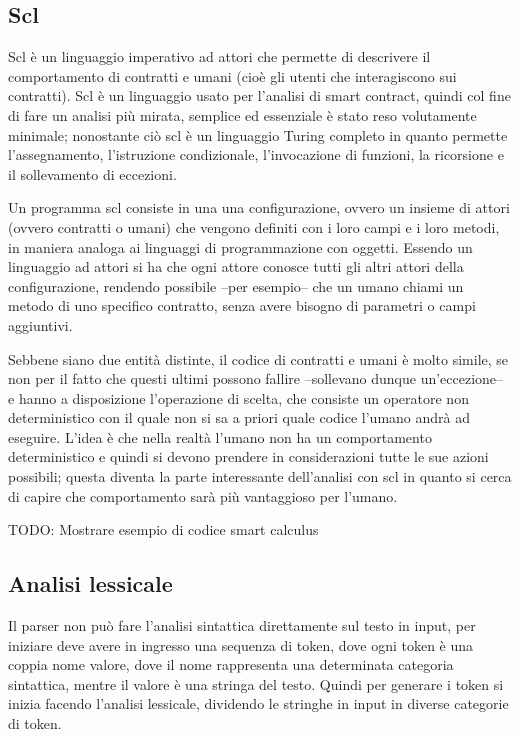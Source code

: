 \documentclass[]{article}
\begin{document}
\hypertarget{scl}{%
\subsection{Scl}\label{scl}}

Scl è un linguaggio imperativo ad attori che permette di descrivere il
comportamento di contratti e umani (cioè gli utenti che interagiscono
sui contratti). Scl è un linguaggio usato per l'analisi di smart
contract, quindi col fine di fare un analisi più mirata, semplice ed
essenziale è stato reso volutamente minimale; nonostante ciò scl è un
linguaggio Turing completo in quanto permette l'assegnamento,
l'istruzione condizionale, l'invocazione di funzioni, la ricorsione e il
sollevamento di eccezioni.

Un programma scl consiste in una una configurazione, ovvero un insieme
di attori (ovvero contratti o umani) che vengono definiti con i loro
campi e i loro metodi, in maniera analoga ai linguaggi di programmazione
con oggetti. Essendo un linguaggio ad attori si ha che ogni attore
conosce tutti gli altri attori della configurazione, rendendo possibile
--per esempio-- che un umano chiami un metodo di uno specifico
contratto, senza avere bisogno di parametri o campi aggiuntivi.

Sebbene siano due entità distinte, il codice di contratti e umani è
molto simile, se non per il fatto che questi ultimi possono fallire
--sollevano dunque un'eccezione-- e hanno a disposizione l'operazione di
scelta, che consiste un operatore non deterministico con il quale non si
sa a priori quale codice l'umano andrà ad eseguire. L'idea è che nella
realtà l'umano non ha un comportamento deterministico e quindi si devono
prendere in considerazioni tutte le sue azioni possibili; questa diventa
la parte interessante dell'analisi con scl in quanto si cerca di capire
che comportamento sarà più vantaggioso per l'umano.

TODO: Mostrare esempio di codice smart calculus

\hypertarget{analisi-lessicale}{%
\subsection{Analisi lessicale}\label{analisi-lessicale}}

Il parser non può fare l'analisi sintattica direttamente sul testo in
input, per iniziare deve avere in ingresso una sequenza di token, dove
ogni token è una coppia nome valore, dove il nome rappresenta una
determinata categoria sintattica, mentre il valore è una stringa del
testo. Quindi per generare i token si inizia facendo l'analisi
lessicale, dividendo le stringhe in input in diverse categorie di token.
\end{document}
